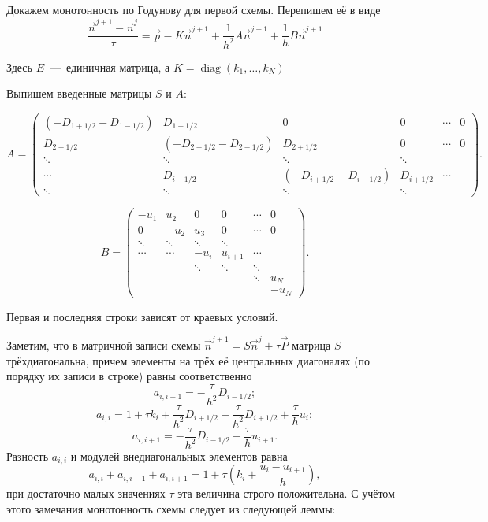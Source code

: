 \documentclass[14pt, a4paper, fleqn]{extarticle}
\newcommand{\diag}{\operatorname{diag}}
\begin{document}
Докажем монотонность по Годунову для первой схемы. Перепишем её в виде $$\dfrac{\vec{n}^{j+1}-\vec{n}^j}{\tau}= \vec{p} - K\vec{n}^{j+1}+\dfrac{1}{h^2}A\vec{n}^{j+1}+\dfrac{1}{h}B\vec{n}^{j+1}$$

Здесь $E$~---~единичная матрица, а $K = \diag(k_1,\dotsc, k_N)$

Выпишем введенные матрицы $S$ и $A$:

$$A = \left(\begin{smallmatrix}
(-D_{1+1/2}-D_{1-1/2}) & D_{1+1/2}             & 0        & 0  & \cdots & 0 \\
D_{2-1/2}              & (-D_{2+1/2}-D_{2-1/2}) & D_{2+1/2} & 0  & \cdots & 0 \\         
\ddots & \ddots & \ddots & \ddots \\
\cdots & D_{i-1/2} & (-D_{i+1/2}-D_{i-1/2}) & D_{i+1/2} &  \cdots &  \\
\ddots & \ddots & \ddots & \ddots
\end{smallmatrix}\right).$$

$$B=\left(\begin{matrix}
-u_1 &  u_2 & 0   & 0  & \cdots & 0 \\
0    & -u_2 & u_3 & 0  & \cdots & 0 \\         
\ddots & \ddots & \ddots & \ddots \\
\cdots & \cdots & -u_i & u_{i+1} &  \cdots &  \\
& & \ddots & \ddots & \ddots\\
& & & & \ddots& u_N\\
& & & & & -u_N
\end{matrix}\right).$$

\smallskip

Первая и последняя строки зависят от краевых условий.

Заметим, что в матричной записи схемы $\vec{n}^{j+1}=S\vec{n}^j + \tau \vec{P}$ матрица $S$ трёхдиагональна, причем элементы на трёх её центральных диагоналях (по порядку их записи в строке) равны соответственно $$a_{i, i-1} = -\dfrac{\tau}{h^2}D_{i-1/2};$$ $$a_{i, i} = 1+\tau k_i + \dfrac{\tau}{h^2}D_{i+1/2}+\dfrac{\tau}{h^2}D_{i+1/2}+\dfrac{\tau}{h}u_i;$$ $$a_{i, i+1} = -\dfrac{\tau}{h^2}D_{i-1/2}-\dfrac{\tau}{h}u_{i+1}.$$
Разность $a_{i,i}$ и модулей внедиагональных элементов равна $$a_{i, i} + a_{i, i-1} + a_{i, i+1} = 1+\tau\left(k_i+\dfrac{u_i-u_{i+1}}{h}\right),$$ при достаточно малых значениях $\tau$ эта величина строго положительна. С учётом этого замечания монотонность схемы следует из следующей леммы:
\end{document}
